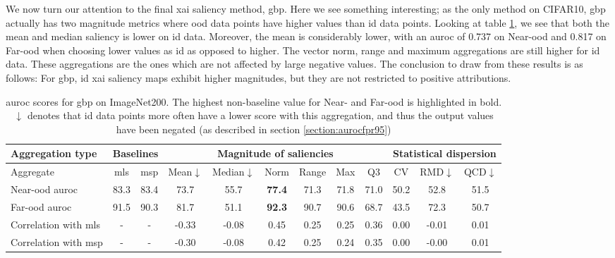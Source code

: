 \documentclass[UKenglish]{uiomasterthesis} %
\theoremstyle{definition}
\begin{document}
We now turn our attention to the final \ac{xai} saliency method, \ac{gbp}. Here we see something interesting; as the only method on CIFAR10, \ac{gbp} actually has two magnitude metrics where \ac{ood} data points have higher values than \ac{id} data points. Looking at table \ref{table:imagenet200_gbp_metrics}, we see that both the mean and median saliency is lower on \ac{id} data. Moreover, the mean is considerably lower, with an \ac{auroc} of 0.737 on Near-\ac{ood} and 0.817 on Far-\ac{ood} when choosing lower values as \ac{id} as opposed to higher. The vector norm, range and maximum aggregations are still higher for \ac{id} data. These aggregations are the ones which are not affected by large negative values. The conclusion to draw from these results is as follows: For \ac{gbp}, \ac{id} \ac{xai} saliency maps exhibit higher magnitudes, but they are not restricted to positive attributions.

\begin{table}[H]
\setlength\tabcolsep{3pt}
\begin{center}
\begin{tabular}{ |p{5.1em}|c c|c c c c c c|c c c| }
    \hline
     \centering Aggregation type & \multicolumn{2}{c|}{Baselines} & \multicolumn{6}{c|}{Magnitude of saliencies} & \multicolumn{3}{p{8em}|}{\centering Statistical dispersion} \\
    \hline
    Aggregate & \ac{mls} & \ac{msp} & Mean$\downarrow$ & Median$\downarrow$ & Norm & Range & Max & Q3 & CV & RMD$\downarrow$ & QCD$\downarrow$  \\
    \hline
    \rowcolor{near!50}
    Near-\ac{ood} \ac{auroc} & 83.3 & 83.4 & 73.7 & 55.7 &\textbf{ 77.4 }& 71.3 & 71.8 & 71.0 & 50.2 & 52.8 & 51.5  \\
    \hline
    \rowcolor{far!50}
    Far-\ac{ood} \ac{auroc} & 91.5 & 90.3 & 81.7 & 51.1 &\textbf{ 92.3 }& 90.7 & 90.6 & 68.7 & 43.5 & 72.3 & 50.7  \\
    \hline
    Correlation with \ac{mls}& - & - & -0.33 & -0.08 & 0.45 & 0.25 & 0.25 & 0.36 & 0.00 & -0.01 & 0.01  \\
    \hline
    Correlation with \ac{msp}& - & - & -0.30 & -0.08 & 0.42 & 0.25 & 0.24 & 0.35 & 0.00 & -0.00 & 0.01  \\
    \hline
    \end{tabular}
    \caption[\ac{auroc} scores for \ac{gbp} on ImageNet200]{\ac{auroc} scores for \ac{gbp} on ImageNet200. The highest non-baseline value for Near- and Far-\ac{ood} is highlighted in bold. $\downarrow$ denotes that \ac{id} data points more often have a lower score with this aggregation, and thus the output values have been negated (as described in section \ref{section:aurocfpr95})}
    \label{table:imagenet200_gbp_metrics}
\end{center}
\setlength\tabcolsep{6pt}
\end{table}
\end{document}
